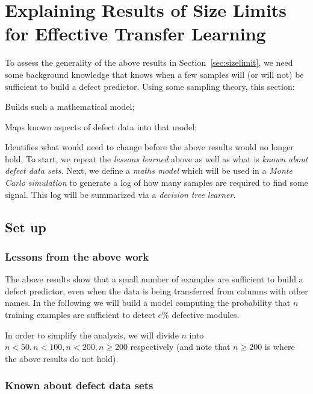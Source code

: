 

%

\newcommand{\tion}[1]{\S\ref{sect:#1}}
\newcommand{\eq}[1]{Equation~\ref{eq:#1}}

\section{Explaining Results of Size Limits for Effective Transfer Learning}\label{sect:xplain}
To assess the generality of the above results in Section~\ref{sec:sizelimit}, we need some background knowledge that knows when a few samples will (or will not)
be sufficient to build a defect predictor. Using some sampling theory, this section:
\bi
\item
Builds such a mathematical model;
\item Maps known aspects
of defect data  into that model;
\item Identifies what would need to change before the above results would no longer hold.
\ei
To start, we repeat the {\em lessons learned} above as well as what is {\em known about defect data sets}.
Next, we define a {\em maths model} which will be used in a {\em Monte Carlo simulation} to generate a log of how many samples are required
to find some signal. This log will be summarized via a {\em decision tree learner}.

\subsection{Set up}
\subsubsection{ Lessons from the above work}

The above results show
that a small number
of examples are sufficient to build a defect predictor, even when the data is being transferred from columns with other names.
In the following we will build a model computing the probability that $n$ training examples are sufficient to detect $e$\% defective modules.

In order to simplify the analysis, we will divide $n$ into
  $n<50, n<100, n<200,n\ge 200$ respectively (and note that $n  \ge 200$ is where the above
  results do not hold).

\subsubsection{Known about defect data sets}\label{sect:data}

